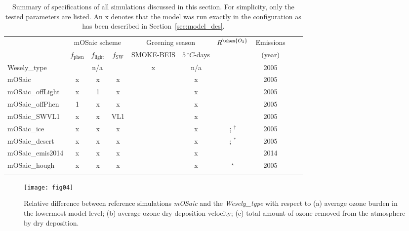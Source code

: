 \documentclass[gmd, manuscript]{copernicus}
\begin{document}
\begin{table}[t]
  \caption{Summary of specifications of all simulations discussed in this section. For simplicity, only the tested parameters are listed. An x denotes that the model was run exactly in the configuration as has been described in Section~\ref{sec:model_des}.}
  \begin{tabular}{lccccccccc}
    \tophline
    \multirow{2}{*}{Simulation} & \multicolumn{3}{c}{mOSaic scheme} & \multicolumn{2}{c}{Greening season} & $R^\chem{O_3}$ & Emissions\\
    & $f_\text{phen}$ & $f_\text{light}$ & $f_\text{SW}$ & SMOKE-BEIS & $5\,\unit{^\circ C}$-days & & (year)\\
    \middlehline
    Wesely\_type      &  \multicolumn{3}{c}{n/a}   & x & n/a& \citet{AE:Wesely1989, JGR:Hough1991}  & 2005 \\
    mOSaic            &   x & x & x                &   &  x & \citet{ACP:Simpson2012}  & 2005 \\
    mOSaic\_offLight  &   x & 1 & x                &   &  x & \citet{ACP:Simpson2012}  & 2005 \\
    mOSaic\_offPhen   &   1 & x & x                &   &  x & \citet{ACP:Simpson2012}  & 2005 \\
    mOSaic\_SWVL1     &   x & x & VL1              &   &  x & \citet{ACP:Simpson2012}  & 2005 \\
    mOSaic\_ice       &   x & x & x                &   &  x & \citet{ACP:Simpson2012}; \citet{ACP:Helmig2007}$^\dagger$ & 2005 \\
    mOSaic\_desert    &   x & x & x                &   &  x & \citet{ACP:Simpson2012}; \citet{AE:Gusten1995}$^*$  & 2005 \\
    mOSaic\_emis2014  &   x & x & x                &   &  x & \citet{ACP:Simpson2012}  & 2014 \\
    mOSaic\_hough     &   x & x & x                &   &  x & \citet{AE:Wesely1989, JGR:Hough1991}$^\star$  & 2005 \\
    \bottomhline
  \end{tabular}
  \label{tab:simsum}
\end{table}
%
\begin{figure}[t]
  \texttt{[image: fig04]}
  \caption{Relative difference between reference simulations \emph{mOSaic} and the \emph{Wesely\_type} with respect to (a) average ozone burden in the lowermost model level; (b) average ozone dry deposition velocity; (c) total amount of ozone removed from the atmosphere by dry deposition.}
  \label{fig:diff_maps}
\end{figure}
\end{document}
